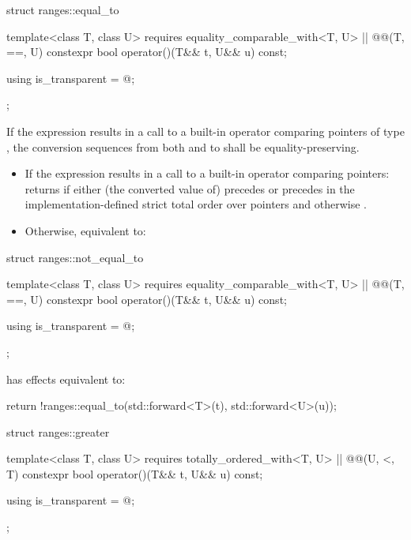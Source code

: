 %
\begin{itemdecl}
struct ranges::equal_to {
  template<class T, class U>
    requires equality_comparable_with<T, U> || @@(T, ==, U)
  constexpr bool operator()(T&& t, U&& u) const;

  using is_transparent = @\unspecnc@;
};
\end{itemdecl}

\begin{itemdescr}
\pnum
\expects
If the expression 
results in a call to a built-in operator \tcode{==} comparing pointers of type
, the conversion sequences from both  and  to 
shall be equality-preserving.

\pnum
\effects
\begin{itemize}
\item
  If the expression  results in
  a call to a built-in operator \tcode{==} comparing pointers:
  returns  if either (the converted value of)  precedes
   or  precedes  in the implementation-defined strict
  total order over pointers and otherwise .

\item
  Otherwise, equivalent to:
\end{itemize}
\end{itemdescr}

%
\begin{itemdecl}
struct ranges::not_equal_to {
  template<class T, class U>
    requires equality_comparable_with<T, U> || @@(T, ==, U)
  constexpr bool operator()(T&& t, U&& u) const;

  using is_transparent = @\unspecnc@;
};
\end{itemdecl}

\begin{itemdescr}
\pnum
{} has effects equivalent to:
\begin{codeblock}
return !ranges::equal_to{}(std::forward<T>(t), std::forward<U>(u));
\end{codeblock}
\end{itemdescr}

%
\begin{itemdecl}
struct ranges::greater {
  template<class T, class U>
    requires totally_ordered_with<T, U> || @@(U, <, T)
  constexpr bool operator()(T&& t, U&& u) const;

  using is_transparent = @\unspecnc@;
};
\end{itemdecl}

